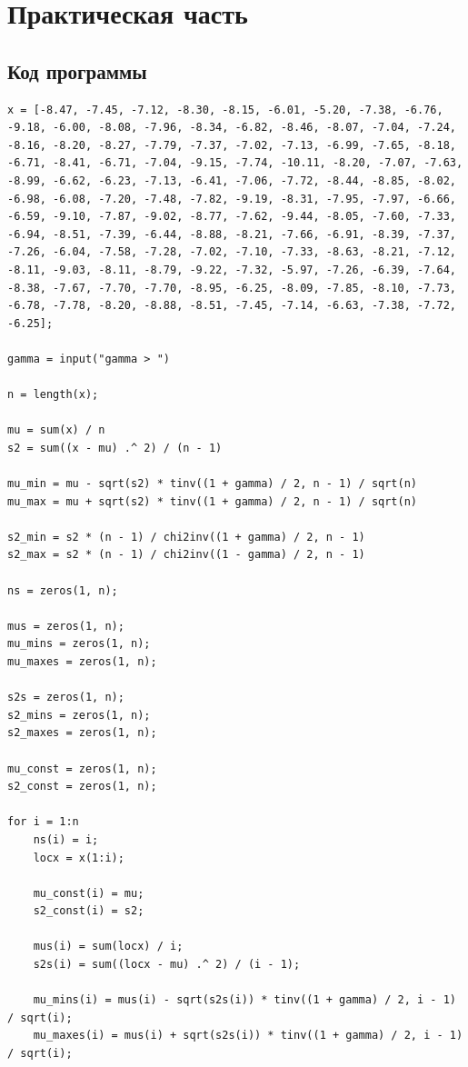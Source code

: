 \chapter{Практическая часть}

\section{Код программы}

\begin{lstlisting}
x = [-8.47, -7.45, -7.12, -8.30, -8.15, -6.01, -5.20, -7.38, -6.76, -9.18, -6.00, -8.08, -7.96, -8.34, -6.82, -8.46, -8.07, -7.04, -7.24, -8.16, -8.20, -8.27, -7.79, -7.37, -7.02, -7.13, -6.99, -7.65, -8.18, -6.71, -8.41, -6.71, -7.04, -9.15, -7.74, -10.11, -8.20, -7.07, -7.63, -8.99, -6.62, -6.23, -7.13, -6.41, -7.06, -7.72, -8.44, -8.85, -8.02, -6.98, -6.08, -7.20, -7.48, -7.82, -9.19, -8.31, -7.95, -7.97, -6.66, -6.59, -9.10, -7.87, -9.02, -8.77, -7.62, -9.44, -8.05, -7.60, -7.33, -6.94, -8.51, -7.39, -6.44, -8.88, -8.21, -7.66, -6.91, -8.39, -7.37, -7.26, -6.04, -7.58, -7.28, -7.02, -7.10, -7.33, -8.63, -8.21, -7.12, -8.11, -9.03, -8.11, -8.79, -9.22, -7.32, -5.97, -7.26, -6.39, -7.64, -8.38, -7.67, -7.70, -7.70, -8.95, -6.25, -8.09, -7.85, -8.10, -7.73, -6.78, -7.78, -8.20, -8.88, -8.51, -7.45, -7.14, -6.63, -7.38, -7.72, -6.25];

gamma = input("gamma > ")

n = length(x);

mu = sum(x) / n
s2 = sum((x - mu) .^ 2) / (n - 1)

mu_min = mu - sqrt(s2) * tinv((1 + gamma) / 2, n - 1) / sqrt(n)
mu_max = mu + sqrt(s2) * tinv((1 + gamma) / 2, n - 1) / sqrt(n)

s2_min = s2 * (n - 1) / chi2inv((1 + gamma) / 2, n - 1)
s2_max = s2 * (n - 1) / chi2inv((1 - gamma) / 2, n - 1)

ns = zeros(1, n);

mus = zeros(1, n);
mu_mins = zeros(1, n);
mu_maxes = zeros(1, n);

s2s = zeros(1, n);
s2_mins = zeros(1, n);
s2_maxes = zeros(1, n);

mu_const = zeros(1, n);
s2_const = zeros(1, n);

for i = 1:n
    ns(i) = i;
    locx = x(1:i);

    mu_const(i) = mu;
    s2_const(i) = s2;

    mus(i) = sum(locx) / i;
    s2s(i) = sum((locx - mu) .^ 2) / (i - 1);

    mu_mins(i) = mus(i) - sqrt(s2s(i)) * tinv((1 + gamma) / 2, i - 1) / sqrt(i);
    mu_maxes(i) = mus(i) + sqrt(s2s(i)) * tinv((1 + gamma) / 2, i - 1) / sqrt(i);


\end{lstlisting}
